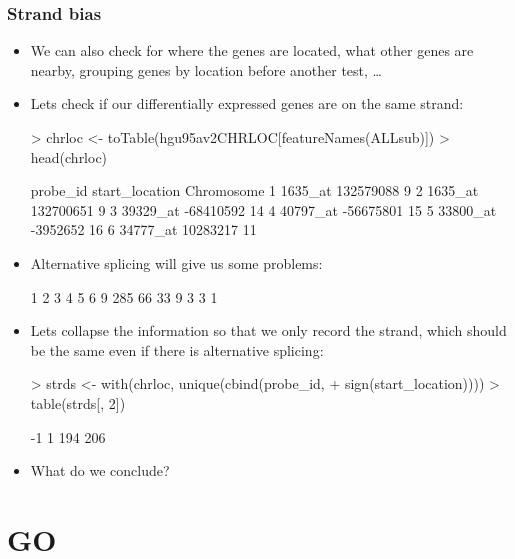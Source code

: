 \begin{frame}
  \frametitle{Strand bias}
  \begin{itemize}
  \item We can also check for where the genes are located, what other genes are nearby, grouping genes by location before another test, \ldots
  \item Lets check if our differentially expressed genes are on the same strand:
\begin{Schunk}
\begin{Sinput}
> chrloc <- toTable(hgu95av2CHRLOC[featureNames(ALLsub)])
> head(chrloc)
\end{Sinput}
\begin{Soutput}
  probe_id start_location Chromosome
1  1635_at      132579088          9
2  1635_at      132700651          9
3 39329_at      -68410592         14
4 40797_at      -56675801         15
5 33800_at       -3952652         16
6 34777_at       10283217         11
\end{Soutput}
\end{Schunk}
  \item Alternative splicing will give us some problems:
\begin{Schunk}
\begin{Soutput}
  1   2   3   4   5   6   9 
285  66  33   9   3   3   1 
\end{Soutput}
\end{Schunk}
  \item Lets collapse the information so that we only record the strand, which should be the same even if there is alternative splicing:
\begin{Schunk}
\begin{Sinput}
> strds <- with(chrloc, unique(cbind(probe_id, 
+     sign(start_location))))
> table(strds[, 2])
\end{Sinput}
\begin{Soutput}
 -1   1 
194 206 
\end{Soutput}
\end{Schunk}
  \item What do we conclude?
  \end{itemize}
\end{frame}

\section{GO}

